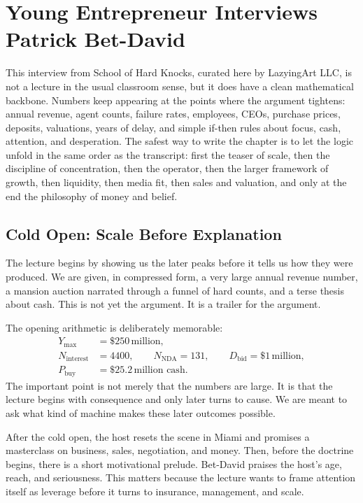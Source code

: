 \chapter{Young Entrepreneur Interviews Patrick Bet-David}

This interview from School of Hard Knocks, curated here by LazyingArt LLC, is not a lecture in the usual classroom sense, but it does have a clean mathematical backbone. Numbers keep appearing at the points where the argument tightens: annual revenue, agent counts, failure rates, employees, CEOs, purchase prices, deposits, valuations, years of delay, and simple if-then rules about focus, cash, attention, and desperation. The safest way to write the chapter is to let the logic unfold in the same order as the transcript: first the teaser of scale, then the discipline of concentration, then the operator, then the larger framework of growth, then liquidity, then media fit, then sales and valuation, and only at the end the philosophy of money and belief.

\section{Cold Open: Scale Before Explanation}

The lecture begins by showing us the later peaks before it tells us how they were produced. We are given, in compressed form, a very large annual revenue number, a mansion auction narrated through a funnel of hard counts, and a terse thesis about cash. This is not yet the argument. It is a trailer for the argument.

The opening arithmetic is deliberately memorable:
\begin{align}
Y_{\max} &= \$250\,\text{million},\\
N_{\text{interest}} &= 4400,\qquad N_{\text{NDA}} = 131,\qquad D_{\text{bid}} = \$1\,\text{million},\\
P_{\text{buy}} &= \$25.2\,\text{million cash}.
\end{align}
The important point is not merely that the numbers are large. It is that the lecture begins with consequence and only later turns to cause. We are meant to ask what kind of machine makes these later outcomes possible.

After the cold open, the host resets the scene in Miami and promises a masterclass on business, sales, negotiation, and money. Then, before the doctrine begins, there is a short motivational prelude. Bet-David praises the host's age, reach, and seriousness. This matters because the lecture wants to frame attention itself as leverage before it turns to insurance, management, and scale.

